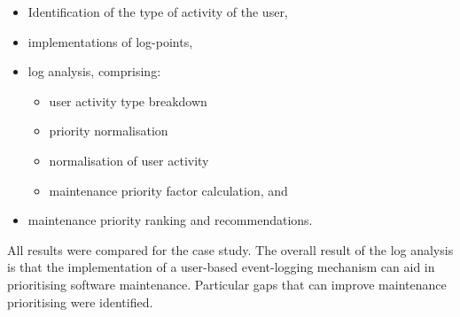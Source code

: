 \begin{itemize}
	\item Identification of the type of activity of the user,
	\item implementations of log-points,
	\item log analysis, comprising:
		\begin{itemize}
			\item user activity type breakdown
			\item priority normalisation
			\item normalisation of user activity
			\item maintenance priority factor calculation, and
		\end{itemize}
	\item maintenance priority ranking and recommendations. 
\end{itemize}

All results were compared for the case study. The overall result of the log analysis is that the implementation of a user-based event-logging mechanism can aid in prioritising software maintenance. Particular gaps that can improve maintenance prioritising were identified.
